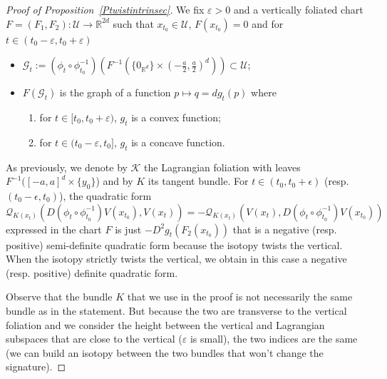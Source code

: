 \documentclass[AHL, Unicode, longabstracts, published]{cedram}
\newcommand*\cq{\mathcal{Q}}
\newcommand*\cg{\mathcal{G}}
\newcommand*\cU{\mathcal{U}}
\newcommand*\cal{\mathcal}
\newcommand*\R{\mathbb{R}}
\begin{document}
\begin{proof}[Proof of Proposition~\ref{Ptwistintrinsec}]
We fix $\varepsilon>0$ and a vertically foliated chart $F=(F_1, F_2): \cU\rightarrow\R^{2d}$ such that $x_{t_0}\in\cal U$, $F(x_{t_0})=0$ and for $t\in (t_0-\varepsilon, t_0+\varepsilon)$
\begin{itemize}
\item ${\cg}_t:=(\phi_t\circ\phi_{t_0}^{-1})(F^{-1}(\{ 0_{\R^d}\}\times (-\frac{a}{2}, \frac{a}{2})^d)) \subset\cU$;
\item $F({\cg_t})$ is the graph of a function $p\mapsto q=dg_t(p)$ where
\begin{enumerate}
\item for $t\in [t_0, t_0+\varepsilon)$, $g_t$ is a convex function;
\item for $t\in (t_0-\varepsilon, t_0]$, $g_t$ is a concave function.
\end{enumerate}
\end{itemize}
As previously, we denote by ${\cal K}$ the Lagrangian foliation with leaves $F^{-1}([-a, a]^d\times \{y_0\}$) and by $K$ its tangent bundle. For $t\in(t_0,t_0+\epsilon)$ (resp. $(t_0-\epsilon, t_0)$), the quadratic form
\[
\cq_{K(x_t)}\left(D\left(\phi_t\circ \phi_{t_0}^{-1}\right)V(x_{t_0}), V(x_t)\right)=-\cq_{K(x_t)}\left(V(x_t), D\left(\phi_t\circ \phi_{t_0}^{-1}\right)V(x_{t_0})\right)
\]
expressed in the chart $F$ is just $-D^2g_t(F_2(x_{t_0}))$ that is a negative (resp. positive) semi-definite quadratic form because the isotopy twists the vertical.\newline
When the isotopy strictly twists the vertical, we obtain in this case a negative (resp. positive) definite quadratic form.

Observe that the bundle $K$ that we use in the proof is not necessarily the same bundle as in the statement. But because the two are transverse to the vertical foliation and we consider the height between the vertical and Lagrangian subspaces that are close to the vertical ($\varepsilon$ is small), the two indices are the same (we can build an isotopy between the two bundles that won't change the signature).
\end{proof}
\end{document}
